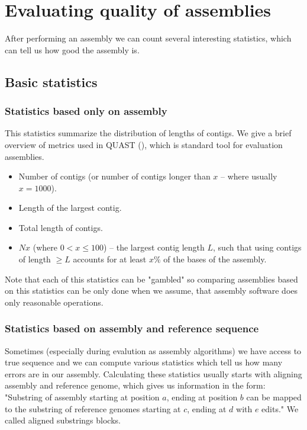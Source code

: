 \chapter{Evaluating quality of assemblies}

After performing an assembly we can count several
interesting statistics, which can tell us how good the assembly is.

\section{Basic statistics}

\subsection{Statistics based only on assembly}

This statistics summarize the distribution of lengths of contigs.
We give a brief overview of metrics used in QUAST (\cite{Quast}), which
is standard tool for evaluation assemblies.

\begin{itemize}
\item Number of contigs (or number of contigs longer than $x$ -- where usually $x = 1000$).
\item Length of the largest contig.
\item Total length of contigs.
\item $Nx$ (where $0 < x \leq 100$) -- the largest contig length $L$, such that using contigs
of length $\geq L$ accounts for at least $x \%$ of the bases of the assembly.
\end{itemize}

Note that each of this statistics can be "gambled" so comparing assemblies based
on this statistics can be only done when we assume, that assembly software does only
reasonable operations.

\subsection{Statistics based on assembly and reference sequence}

Sometimes (especially during evalution as assembly algorithms) we have access to true sequence
and we can compute various statistics which tell us how many errors are in our assembly.
Calculating these statistics usually starts with aligning assembly and reference genome, which
gives us information in the form:
"Substring of assembly starting at position $a$, ending at position $b$ can be mapped
to the substring of reference genomes starting at $c$, ending at $d$ with $e$ edits."
We called aligned substrings blocks. 

